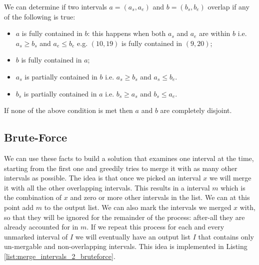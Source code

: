 We can determine if two intervals $a=(a_s,a_e)$ and $b=(b_s,b_e)$ overlap if any of the following is true:
\begin{itemize}
	\item $a$ is fully contained in $b$: this happens when both $a_s$ and $a_e$ are within $b$ i.e. $a_s \geq b_s$ and   $a_e \leq b_e$ e.g. $(10,19)$ is fully contained in $(9,20)$;
	\item $b$ is fully contained in $a$;
	\item $a_s$ is partially contained in $b$ i.e. $a_s \geq b_s $ and $a_s \leq b_e$.
	\item $b_s$ is partially contained in $a$ i.e. $b_s \geq a_s $ and $b_s \leq a_e$.
\end{itemize}
If none of the above condition is met then $a$ and $b$ are completely disjoint.

\subsection{Brute-Force}
\label{example:merge_intervals_2:bruteforce_1}
We can use these facts to build a solution that examines one interval at the time, starting from the first one and greedily tries to merge it with as many other intervals as possible.
The idea is that once we picked an interval $x$ we will merge it with all the other overlapping intervals. 
This results in a interval $m$ which is the combination of $x$ and zero or more other intervals in the list.
We can at this point add $m$ to the output list. We can also mark the intervals we merged $x$ with, so that they will be ignored for the remainder of the process: after-all they are already accounted for in $m$.
If we repeat this process for each and every unmarked interval of $I$ we will eventually have an output list $I$ that contains only un-mergable and non-overlapping intervals. 
This idea is implemented in Listing \ref{list:merge_intervals_2_bruteforce}. 



